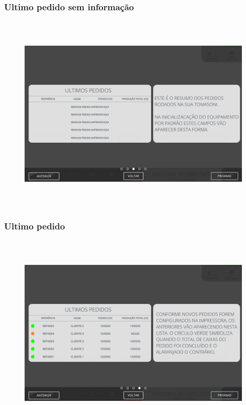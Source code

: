 \vspace*{\fill}

\newpage
\thispagestyle{fancy}

\vspace*{\fill}

\subsubsection{\small{Ultimo pedido sem informação}}


\begin{figure}[h]
  \centering
  \includegraphics[width=576px,height=360px]{src/imagesFlexo/01-main/e-3.png}
   \label{}
\end{figure}

\vspace*{\fill}



\newpage
\thispagestyle{fancy}

\vspace*{\fill}

\subsubsection{\small{Ultimo pedido}}


\begin{figure}[h]
  \centering
  \includegraphics[width=576px,height=360px]{src/imagesFlexo/01-main/e-4.png}
   \label{}
\end{figure}

